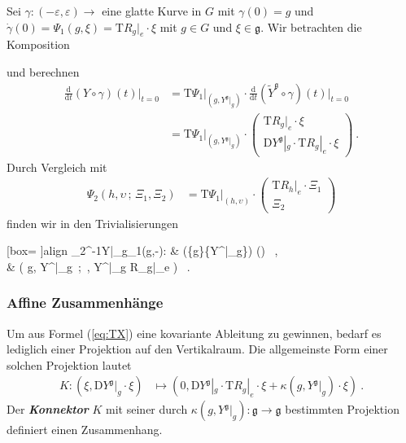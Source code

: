 \documentclass[10pt,a4paper]{article}
\newcommand*\resultbox[1]{%
  \colorbox{yaleblue!10}{\hspace{1em}#1\hspace{1em}}}
\theoremstyle{mytheorem}
\theoremstyle{mydefinition}
\newcommand{\mydef}[1]{\textbf{\textit{#1}}}
\newcommand{\dt}{\mathrm{d}}
\newcommand{\Dt}{\mathrm{D}}
\newcommand{\Tt}{\mathrm{T}}
\begin{document}
Sei $\gamma:(-\varepsilon,\varepsilon)\rightarrow$ eine glatte Kurve in $G$ mit $\gamma(0)=g$ und $\dot{\gamma}(0)=\Psi_1(g,\xi)=\Tt R_g|_e\cdot\xi$ mit $g\in G$ und $\xi\in\mathfrak{g}$.
Wir betrachten die Komposition
\begin{center}
\end{center}
und berechnen
\begin{align*}
	\frac{\dt}{\dt t}
		(Y\circ\gamma)(t)
	\Big|_{t=0}
	&=
	\Tt\Psi_1
	|_{(g, Y^\mathfrak{g}|_{g})}
	\cdot
	\frac{\dt}{\dt t}
		(\tilde{Y}^\mathfrak{g}
		\circ\gamma)(t)
	\Big|_{t=0}
	\nonumber\\
	&=
	\Tt\Psi_1
	|_{(g, Y^\mathfrak{g}|_{g})}
	\cdot
	\begin{pmatrix}
		\Tt R_g|_e\cdot\xi\\
		\Dt Y^\mathfrak{g}|_{g}
		\cdot
		\Tt R_g|_e\cdot\xi
	\end{pmatrix}
	\ .
\end{align*}
Durch Vergleich mit
\begin{align*}
	\Psi_2(h,\upsilon\,;\,\Xi_1,\Xi_2)
	&=
	\Tt\Psi_1
	\big|_{(h,\upsilon)}
	\cdot
	\begin{pmatrix}
		\Tt R_{h}|_e\cdot\Xi_1 \\
		\Xi_2
	\end{pmatrix}		
\end{align*}
finden wir in den Trivialisierungen
\begin{empheq}[box=\resultbox]{align}
\label{eq:TX}
	\Psi_2^{-1}\circ\Tt Y|_g\circ\Psi_1(g,-):
	&\rightarrow
	(\{g\}\times\{Y^|_{g}\})
	\times(\times\mathfrak{g})
	\ ,\nonumber\\
	\upsilon
	&\mapsto
	(
	g, Y^|_{g}
	\,;\,
	\xi,
	\Dt Y^|_{g}
	\cdot
	\Tt R_g|_e\cdot\xi
	)
	\ .
\end{empheq}

\subsubsection{Affine Zusammenhänge}

Um aus Formel (\ref{eq:TX}) eine kovariante Ableitung zu gewinnen, bedarf es lediglich einer Projektion auf den Vertikalraum.
Die allgemeinste Form einer solchen Projektion lautet
\begin{align}
K: (\xi, \Dt Y^\mathfrak{g}|_{g}\cdot\xi)
	&\mapsto 
	(0, 
	\Dt Y^\mathfrak{g}|_{g}\cdot
	\Tt R_g|_e\cdot\xi
	+ \kappa(g, Y^\mathfrak{g}|_{g})\cdot\xi
	)
	\ .
\end{align}
Der \mydef{Konnektor} $K$ mit seiner durch $\kappa(g, Y^\mathfrak{g}|_{g}): \mathfrak{g}\rightarrow\mathfrak{g}$ bestimmten Projektion definiert einen Zusammenhang.
\end{document}
